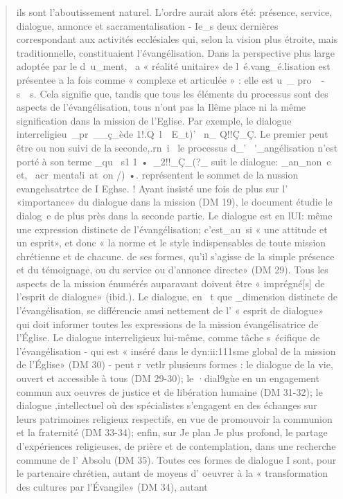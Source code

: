 \begin{quote}
ils sont l'aboutissement naturel. L'ordre aurait alors été: présence,
service, dialogue, annonce et sacramentalisation - Ie_s
deux dernières correspondant aux activités ecclésiales qui,
selon la vision plus étroite, mais traditionnelle, constituaient
l'évangélisation.
Dans la perspective plus large adoptée par le d~u_ment, ~a
« réalité unitaire» de l~é.vang_é.lisation est présentee a la fois
comme « complexe et articulée » : elle est u~_ pro~~-s~~s. Cela
signifie que, tandis que tous les éléments du processus sont
des aspects de l'évangélisation, tous n'ont pas la Ilême place
ni la même signification dans la mission de l'Eglise. Par
exemple, le dialogue interreligieu~_pr~__ç_ède 1!.Q~l~~E_t)' ~n_
Q!!Ç_Ç. Le premier peut être ou non suivi de la seconde,.rn~i~
le processus d_' ~\'_angélisation n'est porté à son terme _qu~ s1
1 •~_2!!_Ç_(?_ suit le dialogue: _an_non~e et, ~acr~menta!i~at~on /) •.
représentent le sommet de la nussion evangehsatrtce de I Eghse. !
Ayant insisté une fois de plus sur l' «importance» du dialogue
dans la mission (DM 19), le document étudie le dialog~e
de plus près dans la seconde partie. Le dialogue est en lUI:
même une expression distincte de l'évangélisation; c'est_au~si
« une attitude et un esprit», et donc « la norme et le style indispensables
de toute mission chrétienne et de chacune. de ses
formes, qu'il s'agisse de la simple présence et du témoignage,
ou du service ou d'annonce directe» (DM 29). Tous les aspects
de la mission énumérés auparavant doivent être « imprégné[s]
de l'esprit de dialogue» (ibid.). Le dialogue, en ~t que _dimension
distincte de l'évangélisation, se différencie amsi nettement
de l' « esprit de dialogue» qui doit informer toutes les
expressions de la mission évangélisatrice de l'Église.
Le dialogue interreligieux lui-même, comme tâche s~écifique
de l'évangélisation - qui est « inséré dans le dyn:ii:111sme
global de la mission de l'Église» (DM 30) - peut r~vetlr plusieurs
formes : le dialogue de la vie, ouvert et accessible à tous
(DM 29-30); le ·dial9gùe en un engagement commun aux
oeuvres de justice et de libération humaine (DM 31-32); le
dialogue ,intellectuel où des spécialistes s'engagent en des
échanges sur leurs patrimoines religieux respectifs, en vue de
promouvoir la communion et la fraternité (DM 33-34); enfin,
sur Je plan Je plus profond, le partage d'expériences religieuses,
de prière et de contemplation, dans une recherche commune
de l' Absolu (DM 35). Toutes ces formes de dialogue I sont,
pour le partenaire chrétien, autant de moyens d' oeuvrer à la
« transformation des cultures par l'Évangile» (DM 34), autant

\end{quote}
